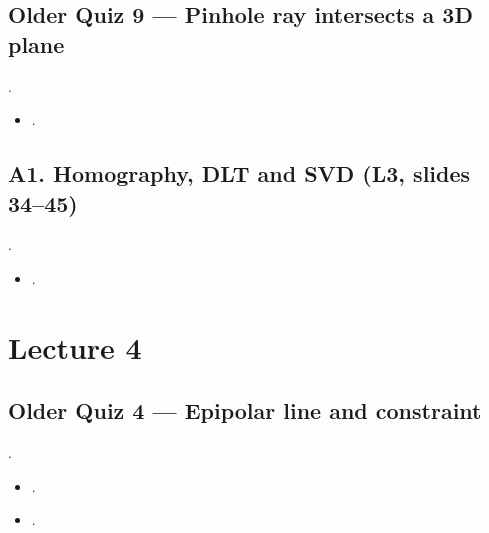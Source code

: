 \documentclass[letterpaper,11pt,english,openany,oneside]{jupyterBook}
\begin{document}
\subsection{Older Quiz 9 — Pinhole ray intersects a 3D plane}
\label{\detokenize{reference/quiz-index:older-quiz-9-pinhole-ray-intersects-a-3d-plane}}
\sphinxAtStartPar
{} .
\begin{itemize}
\item {}
\sphinxAtStartPar
{\hyperref[\detokenize{lectures/lecture03/quiz-workbook:quiz-15-q1}]{}}.

\end{itemize}


\subsection{A1. Homography, DLT and SVD (L3, slides 34–45)}
\label{\detokenize{reference/quiz-index:a1-homography-dlt-and-svd-l3-slides-3445}}
\sphinxAtStartPar
{} . 
\begin{itemize}
\item {}
\sphinxAtStartPar
{\hyperref[\detokenize{lectures/lecture03/quiz-workbook:quiz-a1-q1}]{}}.

\end{itemize}


\section{Lecture 4}
\label{\detokenize{reference/quiz-index:lecture-4}}
\sphinxAtStartPar
{}


\subsection{Older Quiz 4 — Epipolar line and constraint}
\label{\detokenize{reference/quiz-index:older-quiz-4-epipolar-line-and-constraint}}
\sphinxAtStartPar
{} .
\begin{itemize}
\item {}
\sphinxAtStartPar
{\hyperref[\detokenize{lectures/lecture04/quiz-workbook:quiz-1-q1}]{}}.

\item {}
\sphinxAtStartPar
{\hyperref[\detokenize{lectures/lecture04/quiz-workbook:quiz-1-q2}]{}}.

\end{itemize}
\end{document}

